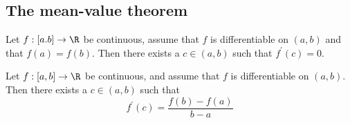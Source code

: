 \subsection{The mean-value theorem}

\begin{theorem}
    Let $f:[a.b] \to \R$ be continuous, assume that $f$ is differentiable on $(a,b)$ and that $f(a) = f(b)$.
    Then there exists a $c \in (a,b)$ such that $f^\prime(c) = 0$.
\end{theorem}

\begin{theorem}
    Let $f: [a,b] \to \R$ be continuous, and assume that $f$ is differentiable on $(a,b)$. Then there exists
    a $c \in (a,b)$ such that
    $$f^\prime(c) = \frac{f(b)-f(a)}{b-a}$$
\end{theorem}

